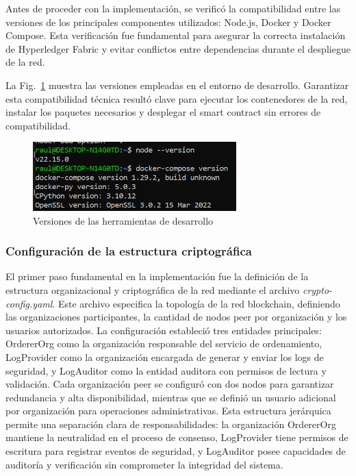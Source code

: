 Antes de proceder con la implementación, se verificó la compatibilidad entre las versiones de los principales componentes utilizados: Node.js, Docker y Docker Compose. Esta verificación fue fundamental para asegurar la correcta instalación de Hyperledger Fabric y evitar conflictos entre dependencias durante el despliegue de la red.

La Fig.~\ref{figura:versiones-entorno} muestra las versiones empleadas en el entorno de desarrollo. Garantizar esta compatibilidad técnica resultó clave para ejecutar los contenedores de la red, instalar los paquetes necesarios y desplegar el smart contract sin errores de compatibilidad.

\begin{figure}[H]
\centering
\includegraphics[width=0.70\textwidth]{figuras/instalacion_herramientas.png}
\caption{Versiones de las herramientas de desarrollo}
\label{figura:versiones-entorno}
\end{figure}

\subsubsection{Configuración de la estructura criptográfica}
El primer paso fundamental en la implementación fue la definición de la estructura organizacional y criptográfica de la red mediante el archivo \textit{crypto-config.yaml}. Este archivo especifica la topología de la red blockchain, definiendo las organizaciones participantes, la cantidad de nodos peer por organización y los usuarios autorizados.
La configuración estableció tres entidades principales: OrdererOrg como la organización responsable del servicio de ordenamiento, LogProvider como la organización encargada de generar y enviar los logs de seguridad, y LogAuditor como la entidad auditora con permisos de lectura y validación. Cada organización peer se configuró con dos nodos para garantizar redundancia y alta disponibilidad, mientras que se definió un usuario adicional por organización para operaciones administrativas.
Esta estructura jerárquica permite una separación clara de responsabilidades: la organización OrdererOrg mantiene la neutralidad en el proceso de consenso, LogProvider tiene permisos de escritura para registrar eventos de seguridad, y LogAuditor posee capacidades de auditoría y verificación sin comprometer la integridad del sistema.

